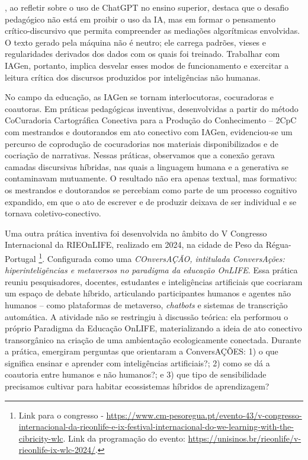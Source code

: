 \documentclass[portuguese]{textolivre}
\begin{document}
\textcite{morgado2024chatgpt}, ao refletir sobre o uso de ChatGPT no ensino superior, destaca que o desafio pedagógico não está em proibir o uso da IA, mas em formar o pensamento crítico-discursivo que permita compreender as mediações algorítmicas envolvidas. O texto gerado pela máquina não é neutro; ele carrega padrões, vieses e regularidades derivados dos dados com os quais foi treinado. Trabalhar com IAGen, portanto, implica desvelar esses modos de funcionamento e exercitar a leitura crítica dos discursos produzidos por inteligências não humanas.

No campo da educação, as IAGen se tornam interlocutoras, cocuradoras e coautoras. Em práticas pedagógicas inventivas, desenvolvidas a partir do método CoCuradoria Cartográfica Conectiva para a Produção do Conhecimento – 2CpC \cite{schlemmerdambros2026metodo} com mestrandos e doutorandos em ato conectivo com IAGen, evidenciou-se um percurso de coprodução de cocuradorias nos materiais disponibilizados e de cocriação de narrativas. Nessas práticas, observamos que a conexão gerava camadas discursivas híbridas, nas quais a linguagem humana e a generativa se contaminavam mutuamente. O resultado não era apenas textual, mas formativo: os mestrandos e doutorandos se percebiam como parte de um processo cognitivo expandido, em que o ato de escrever e de produzir deixava de ser individual e se tornava coletivo-conectivo. 

Uma outra prática inventiva foi desenvolvida no âmbito do V Congresso Internacional da RIEOnLIFE, realizado em 2024, na cidade de Peso da Régua-Portugal \footnote{Link para o congresso - \url{https://www.cm-pesoregua.pt/evento-43/v-congresso-internacional-da-rieonlife-e-ix-festival-internacional-do-we-learning-with-the-cibricity-wlc}. Link da programação do evento: \url{https://unisinos.br/rieonlife/v-rieonlife-ix-wlc-2024/}.}. Configurada como uma \textit{COnversAÇÃO, intitulada ConversAções: hiperinteligências e metaversos no paradigma da educação OnLIFE}. Essa prática reuniu pesquisadores, docentes, estudantes e inteligências artificiais que cocriaram um espaço de debate híbrido, articulando participantes humanos e agentes não humanos – como plataformas de metaverso, \textit{chatbots} e sistemas de transcrição automática. A atividade não se restringiu à discussão teórica: ela performou o próprio Paradigma da Educação OnLIFE, materializando a ideia de ato conectivo transorgânico na criação de uma ambientação ecologicamente conectada. Durante a prática, emergiram perguntas que orientaram a ConversAÇÕES: 1) o que significa ensinar e aprender com inteligências artificiais?; 2) como se dá a coautoria entre humanos e não humanos?; e 3) que tipo de sensibilidade precisamos cultivar para habitar ecossistemas híbridos de aprendizagem?
\end{document}
